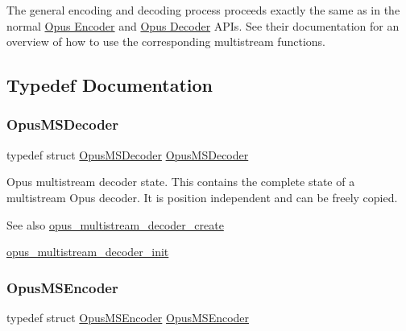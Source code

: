 The general encoding and decoding process proceeds exactly the same as in the normal \hyperlink{group__opus__encoder}{Opus Encoder} and \hyperlink{group__opus__decoder}{Opus Decoder} A\+P\+Is. See their documentation for an overview of how to use the corresponding multistream functions. 

\subsection{Typedef Documentation}
\mbox{\label{group__opus__multistream_gad3497495deb9a8ace82e76cd4f93e0e4}} 
\subsubsection{\texorpdfstring{Opus\+M\+S\+Decoder}{OpusMSDecoder}}
{\footnotesize\ttfamily typedef struct \hyperlink{group__opus__multistream_gad3497495deb9a8ace82e76cd4f93e0e4}{Opus\+M\+S\+Decoder} \hyperlink{group__opus__multistream_gad3497495deb9a8ace82e76cd4f93e0e4}{Opus\+M\+S\+Decoder}}

Opus multistream decoder state. This contains the complete state of a multistream Opus decoder. It is position independent and can be freely copied. \begin{DoxySeeAlso}{See also}
\hyperlink{group__opus__multistream_ga0dc5378a3d4c65498cf530e450b56aa1}{opus\+\_\+multistream\+\_\+decoder\+\_\+create} 

\hyperlink{group__opus__multistream_gac9680d4205a5ea95785e747f0d2e393b}{opus\+\_\+multistream\+\_\+decoder\+\_\+init} 
\end{DoxySeeAlso}
\mbox{\label{group__opus__multistream_gae5826674d142fc873ebc1d781c507dd7}} 
\subsubsection{\texorpdfstring{Opus\+M\+S\+Encoder}{OpusMSEncoder}}
{\footnotesize\ttfamily typedef struct \hyperlink{group__opus__multistream_gae5826674d142fc873ebc1d781c507dd7}{Opus\+M\+S\+Encoder} \hyperlink{group__opus__multistream_gae5826674d142fc873ebc1d781c507dd7}{Opus\+M\+S\+Encoder}}

